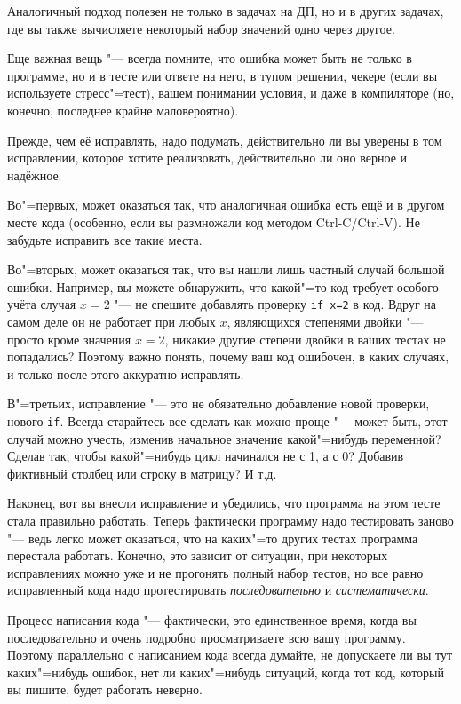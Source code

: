 \documentclass[a4paper,10pt]{problems}
\begin{document}
Аналогичный подход полезен не только в задачах на ДП, но и в других задачах, где вы также вычисляете некоторый набор значений одно через другое.

Еще важная вещь "--- всегда помните, что ошибка может быть не только в программе, но и в тесте или ответе на него, в тупом решении,
чекере (если вы используете стресс"=тест), вашем понимании условия, и даже в компиляторе (но, конечно, последнее крайне маловероятно).

Прежде, чем её исправлять, надо подумать, действительно ли вы уверены в том исправлении, которое хотите реализовать, действительно ли оно верное и надёжное.

Во"=первых, может оказаться так, что аналогичная ошибка есть ещё и в другом месте кода (особенно, если вы размножали код методом Ctrl-C/Ctrl-V).
Не забудьте исправить все такие места.

Во"=вторых, может оказаться так, что вы нашли лишь частный случай большой ошибки. 
Например, вы можете обнаружить, что какой"=то код требует особого учёта случая $x=2$ "--- не спешите добавлять проверку \verb`if x=2` в код.
Вдруг на самом деле он не работает при любых $x$, являющихся степенями двойки "--- просто кроме значения $x=2$, никакие другие степени двойки
в ваших тестах не попадались? Поэтому важно понять, почему ваш код ошибочен, в каких случаях, и только после этого аккуратно исправлять.

В"=третьих, исправление "--- это не обязательно добавление новой проверки, нового \verb`if`. 
Всегда старайтесь все сделать как можно проще "--- может быть, этот случай можно учесть, изменив начальное значение какой"=нибудь переменной?
Сделав так, чтобы какой"=нибудь цикл начинался не с 1, а с 0? Добавив фиктивный столбец или строку в матрицу? И т.д.

Наконец, вот вы внесли исправление и убедились, что программа на этом тесте стала правильно работать.
Теперь фактически программу надо тестировать заново "--- ведь легко может оказаться, что на каких"=то других тестах программа перестала работать.
Конечно, это зависит от ситуации, при некоторых исправлениях можно уже и не прогонять полный набор тестов, но все равно исправленный кода надо
протестировать \textit{последовательно} и \textit{систематически}.


Процесс написания кода "--- фактически, это единственное время, когда вы последовательно и очень подробно просматриваете всю вашу программу.
Поэтому параллельно с написанием кода всегда думайте, не допускаете ли вы тут каких"=нибудь ошибок, нет ли каких"=нибудь ситуаций, 
когда тот код, который вы пишите, будет работать неверно.
\end{document}
